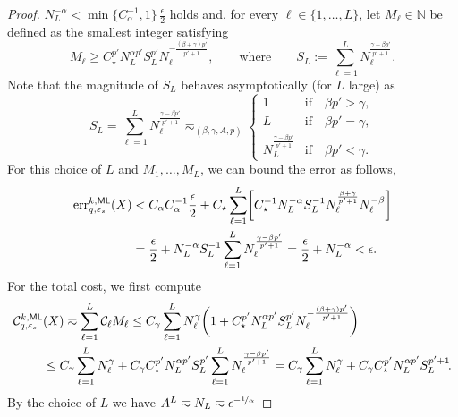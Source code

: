 \documentclass[reqno]{amsart}
\numberwithin{equation}{section}
\newcommand{\bbN}{\mathbb{N}}
\newcommand{\cC}{\mathcal{C}}
\newcommand{\eps}{\varepsilon}
\theoremstyle{remark}
\theoremstyle{definition}
\begin{document}
\begin{proof}
	$N_L^{-\alpha} < 
	\min\{ C_\alpha^{-1},1\} \, \tfrac{\epsilon}{2}$ holds 
	and, for every $\ell\in\{1,\ldots,L\}$, let $M_\ell\in\bbN$ be 
	defined as the smallest integer satisfying 
	\[
	M_\ell 
	\geq 
	C_{\star}^{p'}
	N_L^{ \alpha p' }
	S_L^{p'}  
	N_\ell^{-\frac{ (\beta+\gamma) p' }{p'+1}}, 
	\qquad 
	\text{where} 
	\qquad 
	S_L
	:= 
	\sum_{\ell=1}^L 
	N_{\ell}^{\frac{ \gamma - \beta p' }{p'+1}}. 
	\] 
	Note that the magnitude of $S_L$ 
	behaves asymptotically (for $L$ large) 
	as 
	\begin{equation}\label{eq:theta-L} 
	S_L 
	= 
	\sum_{\ell=1}^L 
	N_{\ell}^{\frac{\gamma-\beta p'}{p'+1}} 
	\eqsim_{(\beta,\gamma,A,p)} 
	\begin{cases} 
	1 & 
	\text{if}\quad  \beta p' > \gamma, 
	\\
	L & 
	\text{if}\quad
	\beta p' = \gamma, 
	\\
	N_L^{\frac{\gamma-\beta p'}{p'+1}} 
	&\text{if}\quad 
	\beta p' < \gamma. 
	\end{cases}
	\end{equation}
	For this choice of $L$ and 
	$M_1,\ldots,M_L$, we can bound the error 
	as follows, 
	\begin{align*} 
	\mathrm{err}^{k, \sf ML}_{q,\eps_s}(X)
	&< 
	C_\alpha 
	C_\alpha^{-1} 
	\frac{\epsilon}{2}
	+ 
	C_{\star} 
	\sum_{\ell=1}^{L}   
	\biggl[ 
	C_{\star}^{-1} 
	N_L^{-\alpha} 
	S_L^{-1} 
	N_\ell^{\frac{\beta+\gamma}{p'+1}} 
	N_\ell^{-\beta}
	\biggr] 
	\\
	&=  
	\frac{\epsilon}{2} 
	+ 
	N_L^{-\alpha} 
	S_L^{-1} 
	\sum_{\ell=1}^L 
	N_\ell^{\frac{\gamma-\beta p' }{p'+1}}
	=  
	\frac{\epsilon}{2} 
	+ 
	N_L^{-\alpha} 
	<  
	\epsilon . 
	\end{align*} 
	For the total cost, 
	we first compute 
	\begin{align*} 
	\cC^{k, \sf ML}_{q,\eps_s}&(X) 
	\eqsim
	\sum_{\ell=1}^L \cC_\ell  M_\ell 
	\leq  
	C_\gamma 
	\sum_{\ell=1}^L N_\ell^\gamma 
	\biggl( 
	1 + 
	C_{\star}^{p'} 
	N_L^{ \alpha p' }
	S_L^{p'}  
	N_\ell^{-\frac{(\beta+\gamma) p' }{p'+1}} 
	\biggr) 
	\\
	&\leq 
	C_\gamma 
	\sum_{\ell=1}^L N_\ell^\gamma 
	+ 
	C_\gamma 
	C_\star^{p'} 
	N_L^{ \alpha p' }
	S_L^{p'}  
	\sum_{\ell=1}^L 
	N_\ell^{\frac{\gamma-\beta p'}{p'+1}} 
	= 
	C_\gamma 
	\sum_{\ell=1}^L N_\ell^\gamma 
	+ 
	C_\gamma 
	C_\star^{p'} 
	N_L^{ \alpha p' }
	S_L^{p'+1} \!.  
	\end{align*}
	By the choice of $L$ 
	we have  
	$A^L \eqsim  N_L \eqsim \epsilon^{-\nicefrac{1}{\alpha}}$ 

\end{proof}
\end{document}
